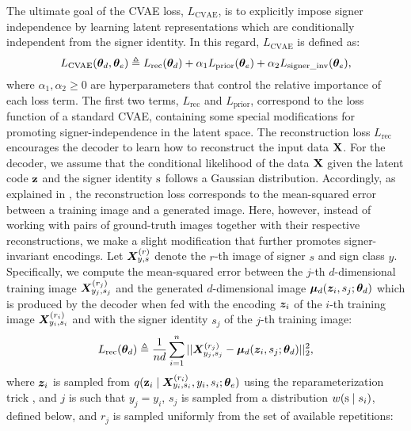 The ultimate goal of the CVAE loss, $L_{\text{CVAE}}$, is to explicitly impose signer independence by learning latent representations which are conditionally independent from the signer identity. In this regard, $L_{\text{CVAE}}$ is defined as:
\begin{equation}
    L_{\text{CVAE}}({\bm{\theta}}_{d},{\bm{\theta}}_{e}) \triangleq L_{\text{rec}}({\bm{\theta}}_{d}) + \alpha_{1} L_{\text{prior}}({\bm{\theta}}_{e}) + \alpha_{2} L_{\text{signer\_inv}}({\bm{\theta}}_{e}),
\end{equation}
where $\alpha_{1},\alpha_{2}\geq 0$ are hyperparameters that control the relative importance of each loss term. The first two terms, $L_{\text{rec}}$ and $L_{\text{prior}}$, correspond to the loss function of a standard CVAE, containing some special modifications for promoting signer-independence in the latent space. The reconstruction loss $L_{\text{rec}}$ encourages the decoder to learn how to reconstruct the input data ${\mathbf{X}}$. For the decoder, we assume that the conditional likelihood of the data ${\mathbf{X}}$ given the latent code ${\mathbf{z}}$ and the signer identity ${\textnormal{s}}$ follows a Gaussian distribution. Accordingly, as explained in , the reconstruction loss corresponds to the mean-squared error between a training image and a generated image. Here, however, instead of working with pairs of ground-truth images together with their respective reconstructions, we make a slight modification that further promotes signer-invariant encodings. Let ${\bm{X}}^{(r)}_{y,s}$ denote the $r$-th image of signer $s$ and sign class $y$. Specifically, we compute the mean-squared error between the $j$-th $d$-dimensional training image ${\bm{X}}^{(r_{j})}_{y_{j},s_{j}}$ and the generated $d$-dimensional image ${\bm{\mu}}_d({\bm{z}}_{i},s_{j}; {\bm{\theta}}_{d})$ which is produced by the decoder when fed with the encoding ${\bm{z}}_{i}$ of the $i$-th training image ${\bm{X}}^{(r_{i})}_{y_{i},s_{i}}$ and with the signer identity $s_j$ of the $j$-th training image:
\begin{equation}
    \label{eq:loss_rec}
    L_{\text{rec}}({\bm{\theta}}_{d}) \triangleq \frac{1}{n d} \sum_{i=1}^{n}||{\bm{X}}^{(r_{j})}_{y_{j},s_{j}}-{\bm{\mu}}_d({\bm{z}}_{i},s_{j}; {\bm{\theta}}_{d})||^2_2,
\end{equation}
where ${\bm{z}}_{i}$ is sampled from $q({\mathbf{z}}_{i} \mid {\bm{X}}^{(r_{i})}_{y_{i},s_{i}}, y_{i}, s_{i}; {\bm{\theta}}_e)$ using the reparameterization trick , and $j$ is such that $y_j=y_i$, $s_{j}$ is sampled from a distribution $w({\textnormal{s}} \mid s_{i})$, defined below, and $r_{j}$ is sampled uniformly from the set of available repetitions:
